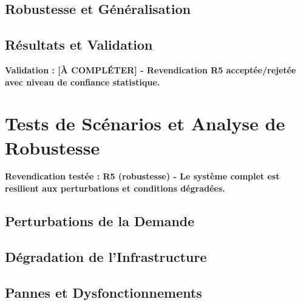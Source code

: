 \subsection{Robustesse et Généralisation}
\label{subsec:robustesse_generalisation}

\subsection{Résultats et Validation}
\label{subsec:resultats_entrainement}

\textbf{Validation : [À COMPLÉTER] - Revendication R5 acceptée/rejetée avec niveau de confiance statistique.}

\section{Tests de Scénarios et Analyse de Robustesse}
\label{sec:tests_scenarios}

\textbf{Revendication testée : R5 (robustesse) - Le système complet est resilient aux perturbations et conditions dégradées.}

\subsection{Perturbations de la Demande}
\label{subsec:perturbations_demande}

\subsection{Dégradation de l'Infrastructure}
\label{subsec:degradation_infra}

\subsection{Pannes et Dysfonctionnements}
\label{subsec:pannes_dysfonctionnements}


